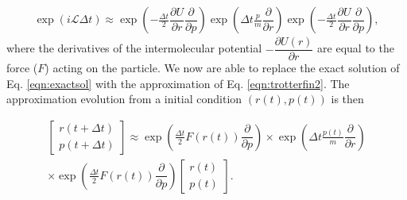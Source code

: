 \documentclass[
	12pt,				%
	openany,			%
	oneside,			%
	a4paper,			%
	english,			%
	brazil				%
	]{abntex2}
\providecommand{\DIFaddbegin}{}
\providecommand{\DIFaddend}{}
\providecommand{\DIFdelbegin}{}
\providecommand{\DIFdelend}{}
\providecommand{\DIFaddbegin}{} %
\providecommand{\DIFaddend}{} %
\providecommand{\DIFdelbegin}{} %
\providecommand{\DIFdelend}{} %
\begin{document}
\begin{equation}
\DIFdelbegin %
\DIFdelend \DIFaddbegin \begin{aligned}
\exp (i\mathcal{L} \Delta t)  \approx
\exp \left (-\frac{\Delta t}{2} \dfrac{\partial U}{\partial r} \dfrac{\partial}{\partial p} \right) \exp \left( \Delta t \frac{p}{m}\dfrac{\partial }{\partial r} \right)\exp \left (-\frac{\Delta t}{2} \dfrac{\partial U}{\partial r} \dfrac{\partial}{\partial p} \right) ,
\end{aligned}
\DIFaddend \label{eqn:trotterfin2}
\end{equation} 
where the derivatives of the intermolecular potential $-\dfrac{\partial U(r)}{\partial r}$ are equal to the force ($F$) acting on the particle. We now are able to replace the exact solution of Eq. \ref{eqn:exactsol} with the approximation of Eq. \ref{eqn:trotterfin2}. The approximation evolution from a initial condition $(r(t),p(t))$  is then

\begin{equation}
\DIFdelbegin %
\DIFdelend \DIFaddbegin \begin{aligned}
\left[ \begin{array}{c} r(t+ \Delta t) \\ p(t + \Delta t) \end{array} \right] \approx
\exp \left (\frac{\Delta t}{2} F(r(t)) \dfrac{\partial}{\partial p} \right) 
\times \exp \left( \Delta t \frac{p(t)}{m}\dfrac{\partial }{\partial r} \right) \\
\times \exp \left (\frac{\Delta t}{2} F(r(t)) \dfrac{\partial}{\partial p} \right)
\left[ \begin{array}{c} r(t) \\ p(t) \end{array} \right] .
\end{aligned}
\DIFaddend \end{equation}
\end{document}
